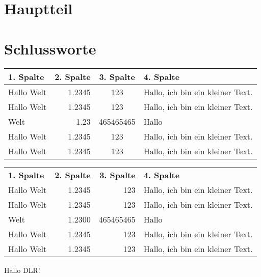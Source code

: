 \documentclass[12pt,ngerman,parskip=half]{scrreprt}
\begin{document}
\blindtext

\blindtext

\section{Hauptteil}\label{sec:hauptteil}

\blindtext[100]


\section{Schlussworte}

\blindtext[10]

\begin{tabular}{|l|r|c|p{70mm}|} \hline
\textbf{1. Spalte} & \textbf{2. Spalte} & \textbf{3. Spalte} & \textbf{4. Spalte} \\ \hline \hline
Hallo Welt & 1.2345 & 123 & Hallo, ich bin ein kleiner Text. \\ \hline
Hallo Welt & 1.2345 & 123 & Hallo, ich bin ein kleiner Text. \\ \hline
Welt & 1.23 & 465465465 & Hallo \\ \hline
Hallo Welt & 1.2345 & 123 & Hallo, ich bin ein kleiner Text. \\ \hline
Hallo Welt & 1.2345 & 123 & Hallo, ich bin ein kleiner Text. \\ \hline
\end{tabular}\vspace*{2cm}

\begin{center}
\begin{tabular}{lrrp{60mm}} \toprule[2pt]
\textbf{1. Spalte} & \textbf{2. Spalte} & \textbf{3. Spalte} & \textbf{4. Spalte} \\ \cmidrule[1pt](rl){1-4}
Hallo Welt & 1.2345 & 123 & Hallo, ich bin ein kleiner Text. \\ 
Hallo Welt & 1.2345 & 123 & Hallo, ich bin ein kleiner Text. \\ 
Welt & 1.2300 & 465465465 & Hallo \\ 
Hallo Welt & 1.2345 & 123 & Hallo, ich bin ein kleiner Text. \\ 
Hallo Welt & 1.2345 & 123 & Hallo, ich bin ein kleiner Text. \\ \bottomrule
\end{tabular}
\end{center}

\begin{center}
\Large Hallo DLR!
\end{center}
\end{document}
